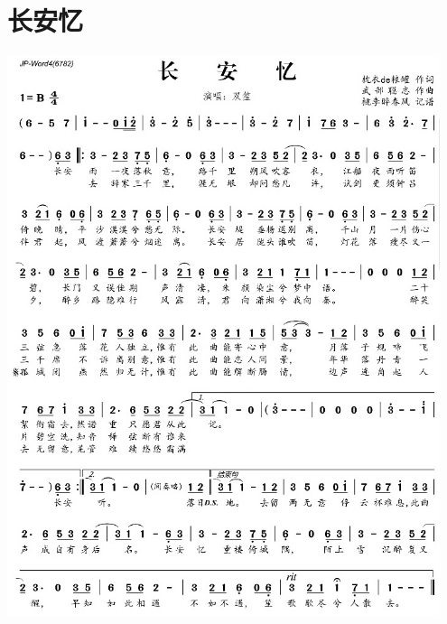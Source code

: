\documentclass[cn,pad,twocol]{elegantbook}
\begin{document}
\section{长安忆}                \includegraphics[width=0.95\textwidth]{rpi400/20210123-长安忆.jpg}
\end{document}
